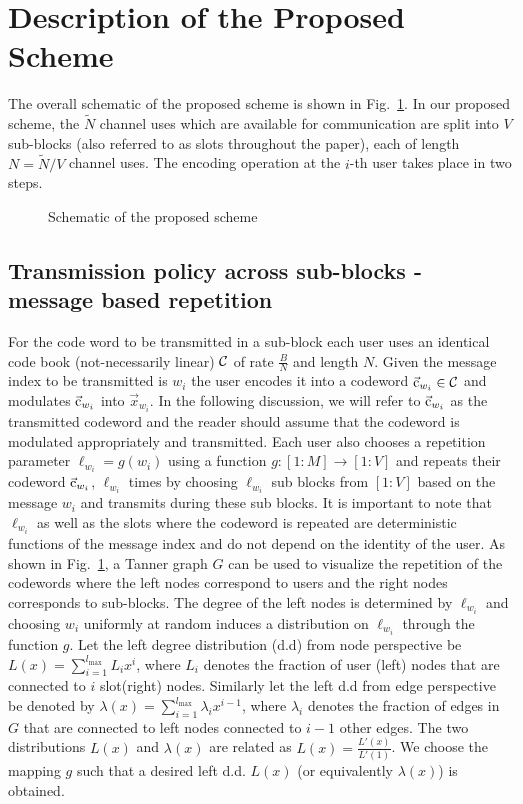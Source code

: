 \section{Description of the Proposed Scheme}
The overall schematic of the proposed scheme is shown in Fig.~\ref{fig:overallscheme}. In our proposed scheme, the $\tilde{N}$ channel uses which are available for communication are split into $V$ sub-blocks (also referred to as slots throughout the paper), each of length $N=\tilde{N}/V$ channel uses. The encoding operation at the $i$-th user takes place in two steps.

\begin{figure}[h]
  \centering
  \resizebox{0.9\textwidth}{!}{}
  \caption{Schematic of the proposed scheme}
  \label{fig:overallscheme}
\end{figure}

\subsection{Transmission policy across sub-blocks - message based repetition}
\label{sec:Txpolicy_TannerGraph}
For the code word to be transmitted in a sub-block each user uses an identical code book (not-necessarily linear) $\mathcal{C}$ of rate $\frac{B}{N}$ and length $N$. Given the message index to be transmitted is $w_i$ the user encodes it into a codeword $\vec{\mathrm{c}}_{w_i} \in \mathcal{C}$ and modulates $\vec{\mathrm{c}}_{w_i}$ into $\vec{x}_{w_i}$. In the following discussion, we will refer to $\vec{\mathrm{c}}_{w_i}$ as the transmitted codeword and the reader should assume that the codeword is modulated appropriately and transmitted. Each user also chooses a repetition parameter $\ell_{w_i}=g(w_i)$ using a function $g:[1:M] \rightarrow [1:V]$ and repeats their codeword $\vec{\mathrm{c}}_{w_i}$, $\ell_{w_i}$ times by choosing $\ell_{w_i}$ sub blocks from $[1:V]$ based on the message $w_i$ and transmits during these sub blocks. It is important to note that $\ell_{w_i}$ as well as the slots where the codeword is repeated are deterministic functions of the message index and do not depend on the identity of the user. As shown in Fig.~\ref{fig:overallscheme}, a Tanner graph $G$ can be used to visualize the repetition of the codewords where the left nodes correspond to users and the right nodes corresponds to sub-blocks. The degree of the left nodes is determined by $\ell_{w_i}$ and choosing $w_i$ uniformly at random induces a distribution on $\ell_{w_i}$ through the function $g$.  Let the left degree distribution (d.d) from node perspective be $L(x) = \sum_{{i=1}}^{{l_{\max}}} L_i x^i$, where $L_i$ denotes the fraction of user (left) nodes that are connected to $i$ slot(right) nodes. Similarly let the left d.d from edge perspective be denoted by $\lambda(x) = \sum_{{i=1}}^{{l_{\max}}} \lambda_i x^{i-1}$, where $\lambda_i$ denotes the fraction of edges in $G$ that are connected to left nodes connected to $i-1$ other edges. The two distributions $L(x)$ and $\lambda(x)$ are related as $L(x)=\frac{L'(x)}{L'(1)}$. We choose the mapping $g$ such that a desired left d.d. $L(x)$ (or equivalently $\lambda(x)$) is obtained.

